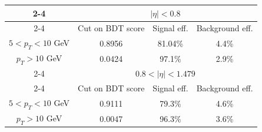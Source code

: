 \begin{table}[h!]
    \centering
    \begin{tabular}{|c|c c c}
\cline{2-4}
  \multicolumn{1}{ c|}{}             & \multicolumn{3}{|c|}{$|\eta| < 0.8 $}                        \\
\cline{2-4} %
   \multicolumn{1}{c|}{}            & Cut on BDT score & Signal eff. & \multicolumn{1}{c|}{Background eff.}  \\
\hline %
$ 5 < p_T < 10 $ GeV              & 0.8956                        & 81.04\%            &  \multicolumn{1}{c|}{4.4\%}  \\
\hline %
 $p_T > 10$ GeV                     &  0.0424	           	     & 97.1\%		&  \multicolumn{1}{c|}{2.9\%}		\\
\hline %
\cline{2-4}
  \multicolumn{1}{ c|}{}             & \multicolumn{3}{|c|}{$0.8 < |\eta| < 1.479$}                        \\
\cline{2-4} %
   \multicolumn{1}{c|}{}            & Cut on BDT score & Signal eff.      & \multicolumn{1}{c|}{Background eff.}  \\
\hline  %
$ 5 < p_T < 10 $ GeV              & 0.9111                     & 79.3\%           &  \multicolumn{1}{c|}{4.6\%}     \\
\hline %
$p_T > 10$ GeV                      &  0.0047		         & 96.3\%	  &  \multicolumn{1}{c|}{3.6\%}		\\
\hline %


\end{tabular}
\end{table}
